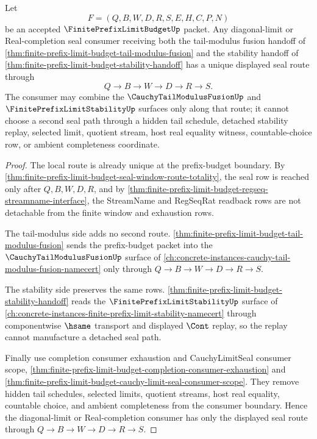 \begin{theorem}
\label{thm:finite-prefix-limit-budget-diagonal-seal-determinacy}
Let
$$
F=(Q,B,W,D,R,S,E,H,C,P,N)
$$
be an accepted $\FinitePrefixLimitBudgetUp$ packet. Any diagonal-limit or Real-completion seal consumer receiving both the tail-modulus fusion handoff of \autoref{thm:finite-prefix-limit-budget-tail-modulus-fusion} and the stability handoff of \autoref{thm:finite-prefix-limit-budget-stability-handoff} has a unique displayed seal route through
$$
Q \to B \to W \to D \to R \to S.
$$
The consumer may combine the $\CauchyTailModulusFusionUp$ and $\FinitePrefixLimitStabilityUp$ surfaces only along that route; it cannot choose a second seal path through a hidden tail schedule, detached stability replay, selected limit, quotient stream, host real equality witness, countable-choice row, or ambient completeness coordinate.
\end{theorem}
\begin{proof}
The local route is already unique at the prefix-budget boundary. By \autoref{thm:finite-prefix-limit-budget-seal-window-route-totality}, the seal row is reached only after $Q,B,W,D,R$, and by \autoref{thm:finite-prefix-limit-budget-regseq-streamname-interface}, the StreamName and RegSeqRat readback rows are not detachable from the finite window and exhaustion rows.

The tail-modulus side adds no second route. \autoref{thm:finite-prefix-limit-budget-tail-modulus-fusion} sends the prefix-budget packet into the $\CauchyTailModulusFusionUp$ surface of \autoref{ch:concrete-instances-cauchy-tail-modulus-fusion-namecert} only through $Q \to B \to W \to D \to R \to S$.

The stability side preserves the same rows. \autoref{thm:finite-prefix-limit-budget-stability-handoff} reads the $\FinitePrefixLimitStabilityUp$ surface of \autoref{ch:concrete-instances-finite-prefix-limit-stability-namecert} through componentwise $\hsame$ transport and displayed $\Cont$ replay, so the replay cannot manufacture a detached seal path.

Finally use completion consumer exhaustion and CauchyLimitSeal consumer scope, \autoref{thm:finite-prefix-limit-budget-completion-consumer-exhaustion} and \autoref{thm:finite-prefix-limit-budget-cauchy-limit-seal-consumer-scope}. They remove hidden tail schedules, selected limits, quotient streams, host real equality, countable choice, and ambient completeness from the consumer boundary. Hence the diagonal-limit or Real-completion consumer has only the displayed seal route through $Q \to B \to W \to D \to R \to S$.
\end{proof}


